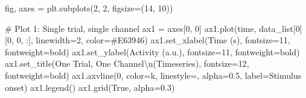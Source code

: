 \documentclass[
  11pt,
  letterpaper,
  oneside,
  openany]{book}
\newenvironment{Shaded}{\begin{snugshade}}{\end{snugshade}}
\newcommand{\CharTok}[1]{\textcolor[rgb]{0.13,0.47,0.30}{#1}}
\newcommand{\CommentTok}[1]{\textcolor[rgb]{0.37,0.37,0.37}{#1}}
\newcommand{\DecValTok}[1]{\textcolor[rgb]{0.68,0.00,0.00}{#1}}
\newcommand{\FloatTok}[1]{\textcolor[rgb]{0.68,0.00,0.00}{#1}}
\newcommand{\NormalTok}[1]{\textcolor[rgb]{0.00,0.23,0.31}{#1}}
\newcommand{\OperatorTok}[1]{\textcolor[rgb]{0.37,0.37,0.37}{#1}}
\newcommand{\StringTok}[1]{\textcolor[rgb]{0.13,0.47,0.30}{#1}}
\newcommand{\VariableTok}[1]{\textcolor[rgb]{0.07,0.07,0.07}{#1}}
\begin{document}
\begin{Shaded}
\begin{Highlighting}[]
\NormalTok{fig, axes }\OperatorTok{=}\NormalTok{ plt.subplots(}\DecValTok{2}\NormalTok{, }\DecValTok{2}\NormalTok{, figsize}\OperatorTok{=}\NormalTok{(}\DecValTok{14}\NormalTok{, }\DecValTok{10}\NormalTok{))}

\CommentTok{\# Plot 1: Single trial, single channel}
\NormalTok{ax1 }\OperatorTok{=}\NormalTok{ axes[}\DecValTok{0}\NormalTok{, }\DecValTok{0}\NormalTok{]}
\NormalTok{ax1.plot(time, data\_list[}\DecValTok{0}\NormalTok{][}\DecValTok{0}\NormalTok{, }\DecValTok{0}\NormalTok{, :], linewidth}\OperatorTok{=}\DecValTok{2}\NormalTok{, color}\OperatorTok{=}\StringTok{\textquotesingle{}\#E63946\textquotesingle{}}\NormalTok{)}
\NormalTok{ax1.set\_xlabel(}\StringTok{\textquotesingle{}Time (s)\textquotesingle{}}\NormalTok{, fontsize}\OperatorTok{=}\DecValTok{11}\NormalTok{, fontweight}\OperatorTok{=}\StringTok{\textquotesingle{}bold\textquotesingle{}}\NormalTok{)}
\NormalTok{ax1.set\_ylabel(}\StringTok{\textquotesingle{}Activity (a.u.)\textquotesingle{}}\NormalTok{, fontsize}\OperatorTok{=}\DecValTok{11}\NormalTok{, fontweight}\OperatorTok{=}\StringTok{\textquotesingle{}bold\textquotesingle{}}\NormalTok{)}
\NormalTok{ax1.set\_title(}\StringTok{\textquotesingle{}One Trial, One Channel}\CharTok{\textbackslash{}n}\StringTok{(Timeseries)\textquotesingle{}}\NormalTok{, fontsize}\OperatorTok{=}\DecValTok{12}\NormalTok{, fontweight}\OperatorTok{=}\StringTok{\textquotesingle{}bold\textquotesingle{}}\NormalTok{)}
\NormalTok{ax1.axvline(}\DecValTok{0}\NormalTok{, color}\OperatorTok{=}\StringTok{\textquotesingle{}k\textquotesingle{}}\NormalTok{, linestyle}\OperatorTok{=}\StringTok{\textquotesingle{}{-}{-}\textquotesingle{}}\NormalTok{, alpha}\OperatorTok{=}\FloatTok{0.5}\NormalTok{, label}\OperatorTok{=}\StringTok{\textquotesingle{}Stimulus onset\textquotesingle{}}\NormalTok{)}
\NormalTok{ax1.legend()}
\NormalTok{ax1.grid(}\VariableTok{True}\NormalTok{, alpha}\OperatorTok{=}\FloatTok{0.3}\NormalTok{)}


\end{Highlighting}
\end{Shaded}
\end{document}
